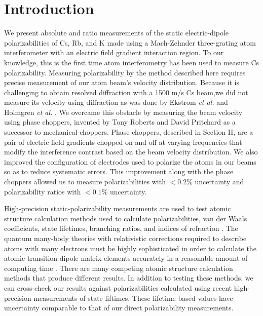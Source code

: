 \documentclass[twocolumn,prl,showpacs,superscriptaddress]{revtex4-1}   %
\newcommand{\etal}{\textit{et al. }}
\begin{document}
\maketitle




\section{Introduction}

We present absolute and ratio measurements of the static electric-dipole polarizabilities of Cs, Rb, and K made using a Mach-Zehnder three-grating atom interferometer \cite{Berman1997,Cronin2009} with an electric field gradient interaction region. To our knowledge, this is the first time atom interferometry has been used to measure Cs polarizability. Measuring polarizability by the method described here requires precise measurement of our atom beam's velocity distribution. Because it is challenging to obtain resolved diffraction with a 1500 m/s Cs beam,we did not measure its velocity using diffraction as was done by Ekstrom \etal and Holmgren \etal \cite{Ekstrom1995,Holmgren2010}. We overcame this obstacle by measuring the beam velocity using phase choppers,  invented by Tony Roberts and David Pritchard \cite{Roberts2002,Roberts2004} as a successor to mechanical choppers.
Phase choppers, described in Section II, are a pair of electric field gradients chopped on and off at varying frequencies that modify the interference contrast based on the beam velocity distribution. 
We also improved the configuration of electrodes used to polarize the atoms in our beams so as to reduce systematic errors. This improvement along with the phase choppers allowed us to measure polarizabilities with $< 0.2\%$ uncertainty and polarizability ratios with $< 0.1\%$ uncertainty.

High-precision static-polarizability measurements are used to test atomic structure calculation methods used to calculate polarizabilities, van der Waals coefficients, state lifetimes, branching ratios, and indices of refraction \cite{Hilborn2002}. The quantum many-body theories with relativistic corrections required to describe atoms with many electrons must be highly sophisticated in order to calculate the atomic transition dipole matrix elements accurately in a reasonable amount of computing time \cite{Mitroy2010}. There are many competing atomic structure calculation methods that produce different results. In addition to testing these methods, we can cross-check our results against polarizabilities calculated using recent high-precision measurements of state liftimes. These lifetime-based values have uncertainty comparable to that of our direct polarizability measurements.
\end{document}
